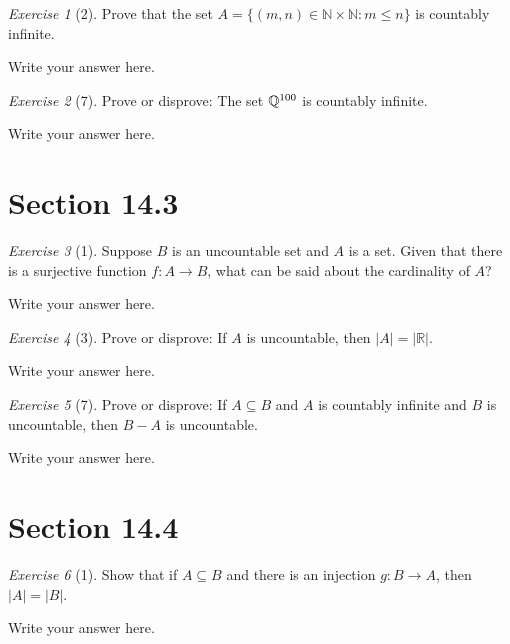 \documentclass[12pt]{amsart}
\makeatletter
\theoremstyle{remark}
\newtheorem*{exercise}{Exercise}%
\def\RR{\ensuremath{\mathbb R}}
\def\NN{\ensuremath{\mathbb N}}
\def\QQ{{\ensuremath\mathbb Q}}
\renewenvironment{proof}[1][\proofname]{\par\doublespacing
  \pushQED{\qed}%
  \normalfont \topsep6\p@\@plus6\p@\relax
  \list{}{%
    \settowidth{\leftmargin}{\itshape\proofname:\hskip\labelsep}%
    \setlength{\labelwidth}{0pt}%
    \setlength{\itemindent}{-\leftmargin}%
  }%
  \item[\hskip\labelsep\itshape#1\@addpunct{:}]\ignorespaces
}{%
  \popQED\endlist\@endpefalse
  \singlespacing
}
\theoremstyle{mycomment}
\makeatother
\begin{document}
\begin{exercise}[2] Prove that the set $A=\{(m,n)\in\NN\times\NN:m\le n\}$ is countably infinite.
\begin{proof}
Write your answer here.
\end{proof}
\end{exercise}

\begin{exercise}[7] Prove or disprove: The set $\QQ^{100}$ is countably infinite.
\begin{proof}
Write your answer here.
\end{proof}
\end{exercise}

\section*{Section 14.3}
\begin{exercise}[1] Suppose $B$ is an uncountable set and $A$ is a set. Given that there is a surjective function $f:A\to B$, what can be said about the cardinality of $A$?
\begin{proof}[Solution]
Write your answer here.
\end{proof}
\end{exercise}


\begin{exercise}[3] Prove or disprove: If $A$ is uncountable, then $|A|=|\RR|$.
\begin{proof}
Write your answer here.
\end{proof}
\end{exercise}

\begin{exercise}[7] Prove or disprove: If $A\subseteq B$ and $A$ is countably infinite and $B$ is uncountable, then $B-A$ is uncountable.
\begin{proof}
Write your answer here.
\end{proof}
\end{exercise}



\section*{Section 14.4}
\begin{exercise}[1] Show that if $A\subseteq B$ and there is an injection $g:B\to A$, then $|A|=|B|$.
\begin{proof}
Write your answer here.
\end{proof}
\end{exercise}
\end{document}

